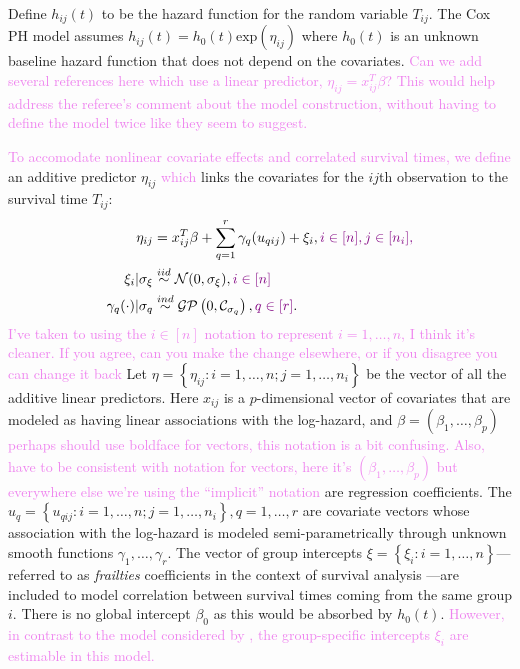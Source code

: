 \documentclass[ba]{imsart}
\newcommand{\alex}[1]{\textcolor{violet}{{ }#1}}
\begin{document}
Define $h_{ij}(t)$ to be the hazard function for the random variable $T_{ij}$. The Cox PH model assumes $h_{ij}(t) = h_0(t)\text{exp}(\eta_{ij})$ where $h_0(t)$ is an unknown baseline hazard function that does not depend on the covariates.\alex{Can we add several references here which use a linear predictor, $\eta_{ij} = x_{ij}^{T}\beta$? This would help address the referee's comment about the model construction, without having to define the model twice like they seem to suggest.}

\alex{To accomodate nonlinear covariate effects and correlated survival times, we define} an additive predictor $\eta_{ij}$\alex{which} links the covariates for the $ij$th observation to the survival time $T_{ij}$:
\begin{equation}\begin{aligned}\label{eqn:eta}
\eta_{ij} &=x_{ij}^{T}\beta+\sum_{q=1}^{r} \gamma_q(u_{qij}) +\xi_{i} , \alex{i\in[n],j\in[n_{i}],} \\
\xi_i | \sigma_{\xi} &\overset{iid}{\sim} \mathcal{N}(0,\sigma_{\xi}) , \alex{i\in[n]}\\
\gamma_{q}(\cdot)|\sigma_{q} &\overset{ind}{\sim} \mathcal{GP}\left(0,\mathcal{C}_{\sigma_q}\right), \alex{q\in[r]} .
\end{aligned}\end{equation}
\alex{I've taken to using the $i\in[n]$ notation to represent $i=1,\ldots,n$, I think it's cleaner. If you agree, can you make the change elsewhere, or if you disagree you can change it back} Let $\eta = \left\{ \eta_{ij}: i = 1,\ldots,n; j = 1,\ldots,n_{i}\right\}$ be the vector of all the additive linear predictors. Here $x_{ij}$ is a $p$-dimensional vector of covariates that are modeled as having linear associations with the log-hazard, and $\beta = (\beta_{1},\ldots,\beta_{p})$\alex{perhaps should use boldface for vectors, this notation is a bit confusing. Also, have to be consistent with notation for vectors, here it's $(\beta_{1},\ldots,\beta_{p})$ but everywhere else we're using the ``implicit'' notation} are regression coefficients. The $u_{q} = \left\{u_{qij}: i = 1,\ldots,n; j = 1,\ldots,n_{i} \right\}, q = 1,\ldots,r$ are covariate vectors whose association with the log-hazard is modeled semi-parametrically through unknown smooth functions $\gamma_1,\ldots,\gamma_r$. The vector of group intercepts $\xi = \left\{ \xi_{i}: i=1,\ldots,n\right\}$---referred to as \textit{frailties} coefficients in the context of survival analysis \citep{frailty}---are included to model correlation between survival times coming from the same group $i$. There is no global intercept $\beta_{0}$ as this would be absorbed by $h_{0}(t)$.\alex{However, in contrast to the model considered by \cite{casecross}, the group-specific intercepts $\xi_{i}$ are estimable in this model.}
\end{document}
